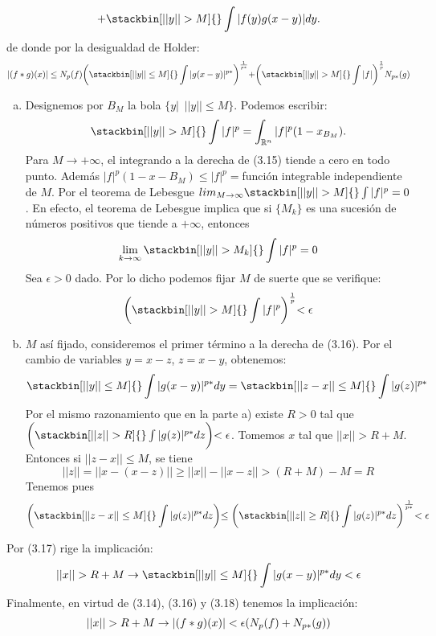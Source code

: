$$
+ \stackbin[||y||> M]{}\int{|f(y)g(x-y)|dy}.
$$
de donde por la desigualdad de Holder:
$$|(f*g)(x)| \leq N_p (f) \biggl(\stackbin[||y|| \leq M]{}\int{|g(x-y)|^{p*}}\biggl)^{\frac{1}{p*}}+\biggl(\stackbin[||y|| > M]{}\int{|f|} \biggl)^{\frac{1}{p}}N_{p*}(g)
$$
\begin{enumerate}[a)]
\item Designemos por $B_M$ la bola $\lbrace y| \phantom{s} ||y|| \leq M \rbrace$. Podemos escribir: 
\begin{equation}
\stackbin[||y||>M]{}\int{|f|^p}=\int_{\Rn}|f|^p (1-x_{B_M}).
\end{equation}
Para $M \to +\infty$, el integrando a la derecha de (3.15) tiende a cero en todo punto. Además $|f|^p (1-x-{B_M}) \leq |f|^p =$función integrable independiente de $M$. Por el teorema de Lebesgue $lim_{M \to \infty}\stackbin[||y|| > M]{}\int{|f|^p}=0$. En efecto, el teorema de Lebesgue implica que si $\lbrace M_k \rbrace$ es una sucesión de números positivos que tiende a $+\infty$, entonces 
$$
\lim_{k \to \infty}\stackbin[||y|| > M_k]{}\int{|f|^p}=0
$$
Sea $\epsilon>0$ dado. Por lo dicho podemos fijar $M$ de suerte que se verifique:
\begin{equation}
\biggl(\stackbin[||y|| > M]{}\int{|f|^p}\biggl)^{\frac{1}{p}}<\epsilon
\end{equation}
\item $M$ así fijado, consideremos el primer término a la derecha de (3.16). Por el cambio de variables $y=x-z$, $z=x-
y$, obtenemos:
\begin{equation}
\stackbin[||y|| \leq M]{}\int{|g(x-y)|^{p*}dy}=\stackbin[||z-x|| \leq M]{}\int{|g(z)|^{p*}}
\end{equation}
Por el mismo razonamiento que en la parte a) existe $R>0$ tal que $\biggl(\stackbin[||z|| > R]{}\int{|g(z)|^{p*}dz}\biggl)<\epsilon$. Tomemos $x$ tal que $||x|| >R+M$. \\
Entonces si $||z-x|| \leq M$, se tiene
$$
||z||=||x-(x-z)|| \geq ||x||-||x-z|| >(R+M)-M=R
$$
Tenemos pues
$$
\biggl(\stackbin[||z-x|| \leq M]{}\int{|g(z)|^{p*}dz}\biggl)\leq \biggl(\stackbin[||z|| \geq R]{}\int{|g(z)|^{p*}dz}\biggl)^{\frac{1}{p*}}<\epsilon
$$
\end{enumerate}
Por (3.17) rige la implicación: 
\begin{equation}
||x|| >R+M \flecha \stackbin[||y|| \leq M]{}\int{|g(x-y)|^{p*}dy}<\epsilon
\end{equation}
Finalmente, en virtud de (3.14), (3.16) y (3.18) tenemos la implicación: 
$$
||x|| >R+M \rightarrow |(f*g)(x)|<\epsilon (N_p (f)+N_{p*}(g))
$$\\

